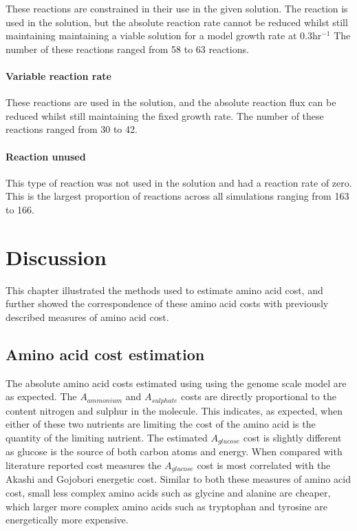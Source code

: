 These reactions are constrained in their use in the given solution. The reaction is used in the solution, but the absolute reaction rate cannot be reduced whilst still maintaining maintaining a viable solution for a model growth rate at 0.3hr$^{-1}$ The number of these reactions ranged from 58 to 63 reactions.

\paragraph{Variable reaction rate}

These reactions are used in the solution, and the absolute reaction flux can be reduced whilst still maintaining the fixed growth rate. The number of these reactions ranged from 30 to 42.

\paragraph{Reaction unused}

This type of reaction was not used in the solution and had a reaction rate of zero. This is the largest proportion of reactions across all simulations ranging from 163 to 166.

\clearpage

\section{Discussion}

This chapter illustrated the methods used to estimate amino acid cost, and further showed the correspondence of these amino acid costs with previously described measures of amino acid cost.

\subsection{Amino acid cost estimation}

The absolute amino acid costs estimated using using the genome scale model are as expected. The $A_{ammonium}$ and $A_{sulphate}$ costs are directly proportional to the content nitrogen and sulphur in the molecule. This indicates, as expected, when either of these two nutrients are limiting the cost of the amino acid is the quantity of the limiting nutrient. The estimated $A_{glucose}$ cost is slightly different as glucose is the source of both carbon atoms and energy. When compared with literature reported cost measures the $A_{glucose}$ cost is most correlated with the Akashi and Gojobori energetic cost. Similar to both these measures of amino acid cost, small less complex amino acids such as glycine and alanine are cheaper, which larger more complex amino acids such as tryptophan and tyrosine are energetically more expensive.

